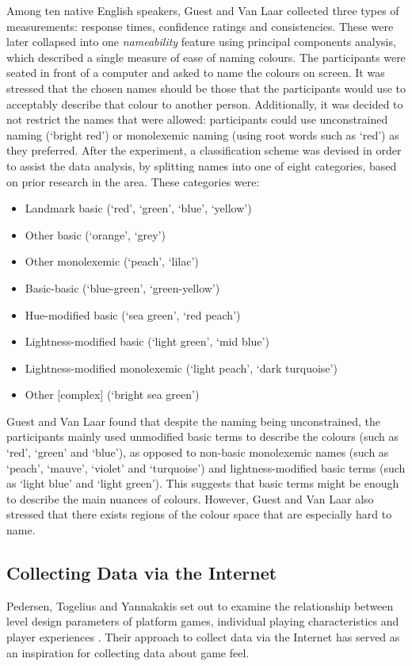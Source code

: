 Among ten native English speakers, Guest and Van Laar collected three types of measurements: response times, confidence ratings and consistencies. These were later collapsed into one \textit{nameability} feature using principal components analysis, which described a single measure of ease of naming colours. The participants were seated in front of a computer and asked to name the colours on screen. It was stressed that the chosen names should be those that the participants would use to acceptably describe that colour to another person. Additionally, it was decided to not restrict the names that were allowed: participants could use unconstrained naming (`bright red') or monolexemic naming (using root words such as `red') as they preferred. After the experiment, a classification scheme was devised in order to assist the data analysis, by splitting names into one of eight categories, based on prior research in the area. These categories were:
\begin{itemize}[noitemsep,nolistsep]
\item Landmark basic (`red', `green', `blue', `yellow')
\item Other basic (`orange', `grey')
\item Other monolexemic (`peach', `lilac')
\item Basic-basic (`blue-green', `green-yellow')
\item Hue-modified basic (`sea green', `red peach')
\item Lightness-modified basic (`light green', `mid blue')
\item Lightness-modified monolexemic (`light peach', `dark turquoise')
\item Other [complex] (`bright sea green')
\end{itemize}
Guest and Van Laar found that despite the naming being unconstrained, the participants mainly used unmodified basic terms to describe the colours (such as `red', `green' and `blue'), as opposed to non-basic monolexemic names (such as `peach', `mauve', `violet' and `turquoise') and lightness-modified basic terms (such as `light blue' and `light green'). This suggests that basic terms might be enough to describe the main nuances of colours. However, Guest and Van Laar also stressed that there exists regions of the colour space that are especially hard to name.

\subsection{Collecting Data via the Internet} \label{marioLevel}
Pedersen, Togelius and Yannakakis set out to examine the relationship between level design parameters of platform games, individual playing characteristics and player experiences \cite{marioModel}. Their approach to collect data via the Internet has served as an inspiration for collecting data about game feel.

